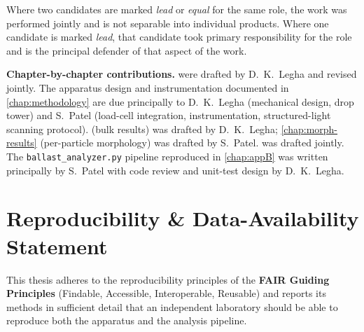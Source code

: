 \vspace{14pt}

\noindent
Where two candidates are marked \emph{lead} or \emph{equal} for the same
role, the work was performed jointly and is not separable into
individual products. Where one candidate is marked \emph{lead}, that
candidate took primary responsibility for the role and is the principal
defender of that aspect of the work.

\vspace{14pt}

\noindent
\textbf{\color{gsvblue}Chapter-by-chapter contributions.}
 were drafted by D.~K.~Legha
and revised jointly. The apparatus design and instrumentation
documented in \cref{chap:methodology} are due principally to
D.~K.~Legha (mechanical design, drop tower) and S.~Patel (load-cell
integration, instrumentation, structured-light scanning protocol).
 (bulk results) was drafted by D.~K.~Legha;
\cref{chap:morph-results} (per-particle morphology) was drafted by
S.~Patel.  was drafted jointly. The
\texttt{ballast\_analyzer.py} pipeline reproduced in
\cref{chap:appB} was written principally by S.~Patel with code review
and unit-test design by D.~K.~Legha.

\endgroup

\cleardoublepage
\chapter*{Reproducibility \& Data-Availability Statement}
\thispagestyle{plain}

\begingroup
\setlength{\parindent}{0pt}

This thesis adheres to the reproducibility principles of the
\textbf{FAIR Guiding Principles} (Findable, Accessible, Interoperable,
Reusable) and reports its methods in sufficient detail that an
independent laboratory should be able to reproduce both the apparatus
and the analysis pipeline.

\bigskip

